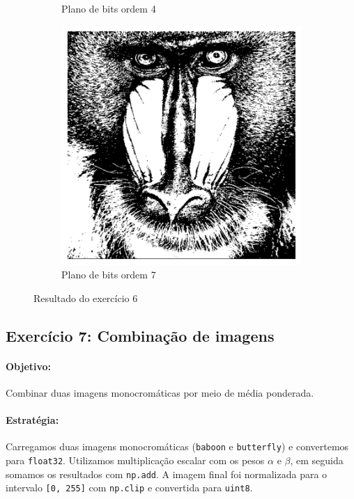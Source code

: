 \documentclass[12pt,a4paper]{report}
\begin{document}
\begin{figure}[H]
\begin{subfigure}[b]{0.32\textwidth}
        \caption{Plano de bits ordem 4}
    \end{subfigure}
    \hfill
    \begin{subfigure}[b]{0.32\textwidth}
        \includegraphics[width=\textwidth]{imagens/ex6-7.png}
        \caption{Plano de bits ordem 7}
    \end{subfigure}
    \caption{Resultado do exercício 6}
\end{figure}


\subsection{Exercício 7: Combinação de imagens}
\paragraph{Objetivo:} 
Combinar duas imagens monocromáticas por meio de média ponderada.

\paragraph{Estratégia:} 
Carregamos duas imagens monocromáticas (\texttt{baboon} e \texttt{butterfly}) e convertemos para \texttt{float32}. Utilizamos multiplicação escalar com os pesos \texttt{\(\alpha\)} e \texttt{\(\beta\)}, em seguida somamos os resultados com \texttt{np.add}. A imagem final foi normalizada para o intervalo \texttt{[0, 255]} com \texttt{np.clip} e convertida para \texttt{uint8}.
\end{document}
